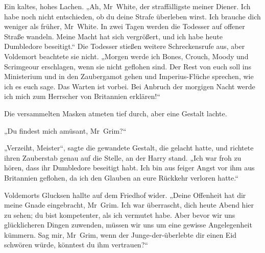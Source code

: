 Ein kaltes, hohes Lachen.
„Ah, Mr~White, der straffälligste meiner Diener. Ich habe noch nicht entschieden, ob du deine Strafe überleben wirst. Ich brauche dich weniger als früher, Mr~White. In zwei Tagen werden die Todesser auf offener Straße wandeln. Meine Macht hat sich vergrößert, und ich habe heute Dumbledore beseitigt.“
Die Todesser stießen weitere Schreckensrufe aus, aber Voldemort beachtete sie nicht.
„Morgen werde ich Bones, Crouch, Moody und Scrimgeour erschlagen, wenn sie nicht geflohen sind. Der Rest von euch soll ins Ministerium und in den Zaubergamot gehen und Imperius-Flüche sprechen, wie ich es euch sage. Das Warten ist vorbei. Bei Anbruch der morgigen Nacht werde ich mich zum Herrscher von Britannien erklären!“

Die versammelten Masken atmeten tief durch, aber eine Gestalt lachte.

„Du findest mich amüsant, Mr~Grim?“

„Verzeiht, Meister“, sagte die gewandete Gestalt, die gelacht hatte, und richtete ihren Zauberstab genau auf die Stelle, an der Harry stand.
„Ich war froh zu hören, dass ihr Dumbledore beseitigt habt. Ich bin aus feiger Angst vor ihm aus Britannien geflohen, da ich den Glauben an eure Rückkehr verloren hatte.“

Voldemorts Glucksen hallte auf dem Friedhof wider.
„Deine Offenheit hat dir meine Gnade eingebracht, Mr~Grim. Ich war überrascht, dich heute Abend hier zu sehen; du bist kompetenter, als ich vermutet habe. Aber bevor wir uns glücklicheren Dingen zuwenden, müssen wir uns um eine gewisse Angelegenheit kümmern. Sag mir, Mr~Grim, wenn der Junge-der-überlebte dir einen Eid schwören würde, könntest du ihm vertrauen?“

